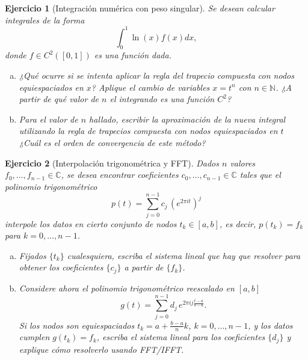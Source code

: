 \documentclass[12pt]{article}%
\def\C{\mathbb{C}}
\newtheorem{exercise}{Ejercicio}
\begin{document}
\begin{exercise}[Integración numérica con peso singular]
Se desean calcular integrales de la forma 
\[ \int_0^1 \ln(x) f(x) dx, \]
donde $f\in C^2([0,1])$ es una función dada. 

\begin{enumerate}[(a)]
    \item ¿Qué ocurre si se intenta aplicar la regla del trapecio compuesta con nodos equiespaciados en $x$? Aplique el cambio de variables $x=t^n$ con $n\in\mathbb{N}$. ¿A partir de qué valor de $n$ el integrando es una función $C^2$? 
    \item Para el valor de $n$ hallado, escribir la aproximación de la nueva integral utilizando la regla de trapecios compuesta con nodos equiespaciados en $t$ ¿Cuál es el orden de convergencia de este método?
\end{enumerate}

\end{exercise}

\begin{exercise}[Interpolación trigonométrica y FFT]
Dados $n$ valores $f_0,\ldots,f_{n-1}\in\C$, se desea encontrar coeficientes $c_0,\ldots,c_{n-1}\in\C$ tales que el polinomio trigonométrico
\[
p(t) = \sum_{j=0}^{n-1} c_j\,(e^{2\pi i t})^j
\]
interpole los datos en cierto conjunto de nodos $t_k \in [a,b]$, es decir, $p(t_k) = f_k$ para $k=0,\ldots,n-1$.

\begin{enumerate}[(a)]
\item Fijados $\{ t_k \}$ cualesquiera, escriba el sistema lineal que hay que resolver para obtener los coeficientes $\{c_j \}$ a partir de $\{ f_k \}$.
\item Considere ahora el polinomio trigonométrico reescalado en $[a,b]$
\[
g(t)=\sum_{j=0}^{n-1} d_j\,e^{2\pi i j\frac{t-a}{b-a}}.
\]
Si los nodos son equiespaciados $t_k=a+\frac{b-a}{n}k$, $k=0,\ldots,n-1$, y los datos cumplen $g(t_k)=f_k$, escriba el sistema lineal para los coeficientes $\{d_j\}$ y explique cómo resolverlo usando FFT/IFFT.
\end{enumerate}
\end{exercise}
\end{document}
